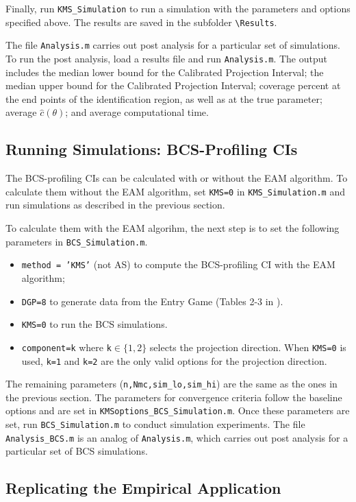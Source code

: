 \documentclass[12pt]{article}
\def\code#1{\texttt{#1}}
\begin{document}
Finally, run \code{KMS\_Simulation} to run a simulation with the parameters and options specified above.  The results are saved in the subfolder \code{\textbackslash Results}.

The file \code{Analysis.m} carries out post analysis for a particular set of simulations.  To run the post analysis, load a results file and run \code{Analysis.m}.  The output includes the median lower bound for the Calibrated Projection Interval; the median upper bound for the Calibrated Projection Interval; coverage percent at the end points of the identification region, as well as at the true parameter; average $\hat c(\theta)$; and average computational time.

\subsection{Running Simulations: BCS-Profiling CIs}\label{sec:BCS_simulations}
 The BCS-profiling CIs can be calculated with or without  the EAM algorithm. To calculate them without the EAM algorithm, set \code{KMS=0} in \code{KMS\_Simulation.m} and run simulations as described in the previous section. 
 
 To calculate them with the EAM algorihm, the next step is to set the following parameters in \code{BCS\_Simulation.m}.
\begin{itemize}
    \item \code{method = 'KMS'} (not AS) to compute the BCS-profiling CI with the EAM algorithm;
    \item \code{DGP=8} to generate data from the Entry Game  (Tables 2-3 in ).
    \item \code{KMS=0} to run the BCS simulations.
    \item \code{component=k} where \code{k}$\in \{1,2\}$ selects the projection direction.  When \code{KMS=0} is used, \code{k=1} and \code{k=2} are the only valid options for the projection direction.
    \end{itemize}
The remaining parameters (\code{n,Nmc,sim\_lo,sim\_hi}) are the same as the ones in the previous section. The parameters for convergence criteria follow the baseline options and are set in \code{KMSoptions\_BCS\_Simulation.m}. Once these parameters are set, run \code{BCS\_Simulation.m} to conduct simulation experiments. The file \code{Analysis\_BCS.m} is an analog of \code{Analysis.m}, which carries out post analysis for a particular set of BCS simulations.


\subsection{Replicating the Empirical Application}\label{sec:application}
\end{document}
